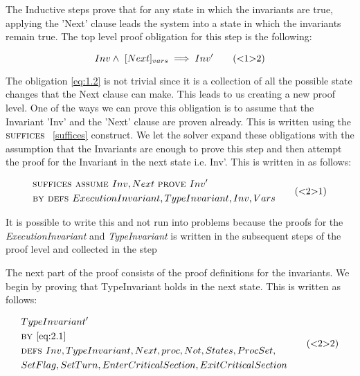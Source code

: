 \documentclass[fleqn]{tukseminar}
\begin{document}
			The Inductive steps prove that for any state in which the invariants are true, applying the 'Next' clause leads the system into a state in which the invariants remain true. The top level proof obligation for this step is  the following:
			
			\begin{equation} \label{eq:1.2}
				Inv \land \  [Next]_{vars} \implies Inv' \tag{<1>2}
			\end{equation}
			
			
			The obligation \ref{eq:1.2} is not trivial since it is a collection of all the possible state changes that the Next clause can make. This leads to us creating a new proof level. One of the ways we can prove this obligation is to assume that the Invariant 'Inv' and the 'Next' clause are proven already. This is written using the $\textsc{suffices }$ \ref{suffices} construct. We let the solver expand these obligations with the assumption that the Invariants are enough to prove this step and then attempt the proof for the Invariant in the next state i.e. Inv'. This is written in \tla as follows:
			
			\begin{equation} \label{eq:2.1}
				\begin{aligned}
					& \textsc{suffices } \textsc{assume } Inv, Next \ \textsc{prove } Inv' \\
					& \textsc{by } \textsc{defs } ExecutionInvariant, TypeInvariant,Inv,Vars
				\end{aligned}
				\tag{<2>1}
			\end{equation}
			
			
			It is possible to write this and not run into problems because the proofs for the  \textit{ExecutionInvariant} and \textit{TypeInvariant} is written in the subsequent steps of the proof level and collected in the \QED step
			
			The next part of the proof consists of the  proof definitions for the invariants. We begin by proving that TypeInvariant holds in the next state. This is written as follows:
			
			\begin{equation} \label{eq:2.2}
				\begin{aligned}
					& TypeInvariant'\\
					& \textsc{by } \ref{eq:2.1} \\
					& \textsc{defs } Inv, TypeInvariant, Next, proc, Not, States, ProcSet,\\
					& SetFlag, SetTurn, EnterCriticalSection, ExitCriticalSection
				\end{aligned}
				\tag{<2>2}
			\end{equation}
			
\end{document}
